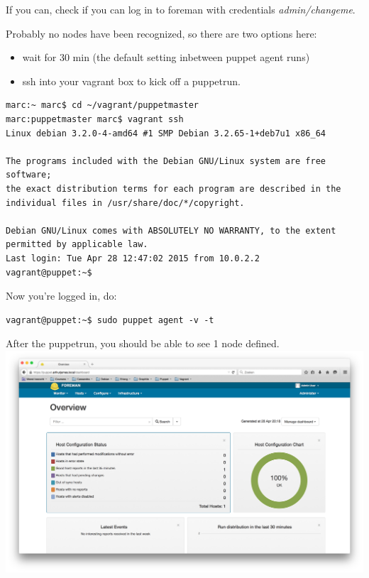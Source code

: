\documentclass{article}
\begin{document}
\par If you can, check if you can log in to foreman with credentials \emph{admin/changeme}.
\par Probably no nodes have been recognized, so there are two options here:
\begin{itemize}
\item wait for 30 min (the default setting inbetween puppet agent runs)
\item ssh into your vagrant box to kick off a puppetrun.
\end{itemize} 

\begin{verbatim}
marc:~ marc$ cd ~/vagrant/puppetmaster
marc:puppetmaster marc$ vagrant ssh
Linux debian 3.2.0-4-amd64 #1 SMP Debian 3.2.65-1+deb7u1 x86_64

The programs included with the Debian GNU/Linux system are free software;
the exact distribution terms for each program are described in the
individual files in /usr/share/doc/*/copyright.

Debian GNU/Linux comes with ABSOLUTELY NO WARRANTY, to the extent
permitted by applicable law.
Last login: Tue Apr 28 12:47:02 2015 from 10.0.2.2
vagrant@puppet:~$
\end{verbatim}

\par Now you're logged in, do:\\
\begin{verbatim}
vagrant@puppet:~$ sudo puppet agent -v -t
\end{verbatim}

After the puppetrun, you should be able to see 1 node defined.\\
\includegraphics[scale=0.3]{images/dashboard}
\end{document}
